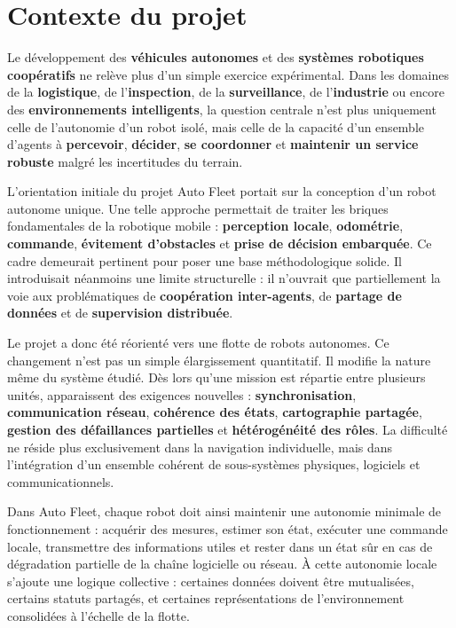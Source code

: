 \documentclass[11pt,a4paper]{report}
\newcommand{\kw}[1]{\textbf{#1}}
\begin{document}
\section{Contexte du projet}

Le développement des \kw{véhicules autonomes} et des \kw{systèmes robotiques coopératifs} ne relève plus d’un simple exercice expérimental. Dans les domaines de la \kw{logistique}, de l’\kw{inspection}, de la \kw{surveillance}, de l’\kw{industrie} ou encore des \kw{environnements intelligents}, la question centrale n’est plus uniquement celle de l’autonomie d’un robot isolé, mais celle de la capacité d’un ensemble d’agents à \kw{percevoir}, \kw{décider}, \kw{se coordonner} et \kw{maintenir un service robuste} malgré les incertitudes du terrain.

L’orientation initiale du projet Auto Fleet portait sur la conception d’un robot autonome unique. Une telle approche permettait de traiter les briques fondamentales de la robotique mobile : \kw{perception locale}, \kw{odométrie}, \kw{commande}, \kw{évitement d’obstacles} et \kw{prise de décision embarquée}. Ce cadre demeurait pertinent pour poser une base méthodologique solide. Il introduisait néanmoins une limite structurelle : il n’ouvrait que partiellement la voie aux problématiques de \kw{coopération inter-agents}, de \kw{partage de données} et de \kw{supervision distribuée}.

Le projet a donc été réorienté vers une flotte de robots autonomes. Ce changement n’est pas un simple élargissement quantitatif. Il modifie la nature même du système étudié. Dès lors qu’une mission est répartie entre plusieurs unités, apparaissent des exigences nouvelles : \kw{synchronisation}, \kw{communication réseau}, \kw{cohérence des états}, \kw{cartographie partagée}, \kw{gestion des défaillances partielles} et \kw{hétérogénéité des rôles}. La difficulté ne réside plus exclusivement dans la navigation individuelle, mais dans l’intégration d’un ensemble cohérent de sous-systèmes physiques, logiciels et communicationnels.

Dans Auto Fleet, chaque robot doit ainsi maintenir une autonomie minimale de fonctionnement : acquérir des mesures, estimer son état, exécuter une commande locale, transmettre des informations utiles et rester dans un état sûr en cas de dégradation partielle de la chaîne logicielle ou réseau. À cette autonomie locale s’ajoute une logique collective : certaines données doivent être mutualisées, certains statuts partagés, et certaines représentations de l’environnement consolidées à l’échelle de la flotte.
\end{document}
